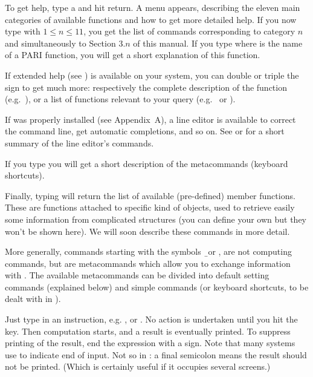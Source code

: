 
To get help, type a  and hit return. A menu appears, describing the
eleven main categories of available functions and how to get more detailed
help. If you now type  with $1\le n\le11$, you get the list of
commands corresponding to category $n$ and simultaneously to Section $3.n$ of
this manual. If you type  where 
is the name of a PARI function, you will get a short explanation of this
function.

If extended help (see ) is available on your system,
you can double or triple the  sign to get much more: respectively the
complete description of the function (e.g.~), or a list of
 functions relevant to your query (e.g.~ 
or ).

If  was properly installed (see Appendix~A), a line editor is
available to correct the command line, get automatic completions, and so on.
See  or  for a short summary of the line
editor's commands.

If you type  you will get a short description of the metacommands
(keyboard shortcuts).

Finally, typing  will return the list of available (pre-defined)
member functions. These are functions attached to specific kind of objects,
used to retrieve easily some information from complicated structures (you can
define your own but they won't be shown here). We will soon describe these
commands in more detail.

More generally, commands starting with the symbols \b\ or , are not
computing commands, but are metacommands which allow you to exchange
information with . The available metacommands can be divided into
default setting commands (explained below) and simple commands (or keyboard
shortcuts, to be dealt with in ).


Just type in an instruction, e.g. , or . No action is
undertaken until you hit the  key. Then computation starts, and
a result is eventually printed. To suppress printing of the result, end the
expression with a \kbd{;} sign. Note that many systems use \kbd{;} to
indicate end of input. Not so in : a final semicolon means the
result should not be printed. (Which is certainly useful if it occupies
several screens.)

